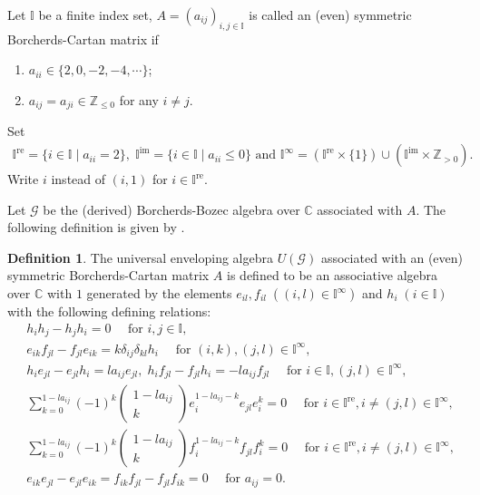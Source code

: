 \documentclass[12pt]{amsart}
\theoremstyle{definition}
\newtheorem{definition}[theorem]{Definition}
\numberwithin{equation}{section}
\begin{document}
Let $ \mathbb{I} $ be a finite index set, $ A = (a_{ij})_{i,j \in \mathbb{I}} $ is called an (even) symmetric Borcherds-Cartan matrix if
\begin{enumerate}
    \item $ a_{ii} \in \{2,0,-2,-4,\cdots \} $;
    \item $ a_{ij} = a_{ji} \in \mathbb{Z}_{\leqslant 0} $ for any $ i \neq j $.
\end{enumerate}
Set
\begin{align*}
    \mathbb{I}^{\mathrm{re}} = \{ i \in \mathbb{I} \mid a_{ii}=2\}, \;\mathbb{I}^{\mathrm{im}} = \{ i \in \mathbb{I} \mid a_{ii} \leqslant 0\} \text{ and }
     \mathbb{I}^{\infty} = (\mathbb{I}^{\mathrm{re}} \times \{1\}) \cup (\mathbb{I}^{\mathrm{im}} \times \mathbb{Z}_{>0}).
\end{align*}
Write $ i $ instead of $ (i,1) $ for $ i \in \mathbb{I}^{\mathrm{re}} $. 

Let $ \mathcal{G} $ be  the (derived) Borcherds-Bozec algebra over $ \mathbb{C} $ associated with $ A $. 
The following definition is given by \cite[Proposition 2.1]{FKKB21}.

\begin{definition}
   The universal enveloping algebra $ U(\mathcal{G}) $ associated with an (even) symmetric Borcherds-Cartan matrix $ A $ is defined to be an associative algebra over $\mathbb{C} $ with $ 1 $ generated by the elements $ e_{il},f_{il} \;((i,l)\in \mathbb{I}^{\infty})  $ and $ h_i \;(i \in \mathbb{I}) $ with the following defining relations:
    \begin{align}
        & h_i h_j - h_j h_i = 0 \quad \text{ for } i,j \in \mathbb{I}, \label{Relation 1}\\
        & e_{ik} f_{jl} - f_{jl} e_{ik} = k \delta_{ij}\delta_{kl} h_i \quad \text{ for } (i,k),(j,l) \in \mathbb{I}^{\infty}, \label{Relation 2}\\
        & h_ie_{jl}-e_{jl}h_i = l a_{ij}e_{jl}, \; h_if_{jl}-f_{jl}h_i = -l a_{ij}f_{jl} \quad \text{ for } i \in \mathbb{I},(j,l) \in \mathbb{I}^{\infty}, \label{Relation 3}\\
        & \sum\limits_{k=0}^{1-la_{ij}}(-1)^k \begin{pmatrix}
            1-l{a_{ij}} \\
            k
        \end{pmatrix}
        e_{i}^{1-la_{ij}-k} e_{jl} e_i^k = 0 \quad \text{ for }  i \in \mathbb{I}^{\mathrm{re}}, i \neq (j,l) \in \mathbb{I}^{\infty}, \label{Relation 4}\\
        & \sum\limits_{k=0}^{1-la_{ij}}(-1)^k \begin{pmatrix}
            1-l{a_{ij}} \\
            k
        \end{pmatrix}
        f_{i}^{1-la_{ij}-k} f_{jl} f_i^k = 0 \quad \text{ for }  i \in \mathbb{I}^{\mathrm{re}}, i \neq (j,l) \in \mathbb{I}^{\infty}, \label{Relation 5}\\
        & e_{ik} e_{jl} - e_{jl} e_{ik} =  f_{ik} f_{jl} - f_{jl} f_{ik} = 0 \quad \text{ for } a_{ij} = 0.\label{Relation 6}
    \end{align}
\end{definition}
\end{document}

